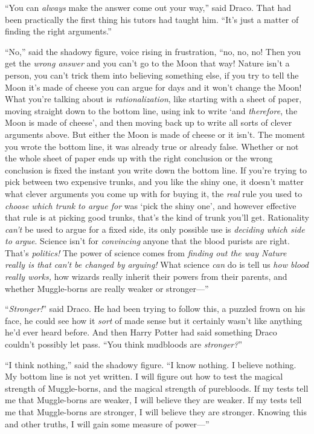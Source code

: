 “You can \emph{always} make the answer come out your way,” said Draco. That had been practically the first thing his tutors had taught him. “It’s just a matter of finding the right arguments.”

“No,” said the shadowy figure, voice rising in frustration, “no, no, no! Then you get the \emph{wrong answer} and you can’t go to the Moon that way! Nature isn’t a person, you can’t trick them into believing something else, if you try to tell the Moon it’s made of cheese you can argue for days and it won’t change the Moon! What you’re talking about is \emph{rationalization}, like starting with a sheet of paper, moving straight down to the bottom line, using ink to write ‘and \emph{therefore}, the Moon is made of cheese’, and then moving back up to write all sorts of clever arguments above. But either the Moon is made of cheese or it isn’t. The moment you wrote the bottom line, it was already true or already false. Whether or not the whole sheet of paper ends up with the right conclusion or the wrong conclusion is fixed the instant you write down the bottom line. If you’re trying to pick between two expensive trunks, and you like the shiny one, it doesn’t matter what clever arguments you come up with for buying it, the \emph{real} rule you used to \emph{choose which trunk to argue for} was ‘pick the shiny one’, and however effective that rule is at picking good trunks, that’s the kind of trunk you’ll get. Rationality \emph{can’t} be used to argue for a fixed side, its only possible use is \emph{deciding which side to argue}. Science isn’t for \emph{convincing} anyone that the blood purists are right. That’s \emph{politics!} The power of science comes from \emph{finding out the way Nature really is that can’t be changed by arguing!} What science \emph{can} do is tell us \emph{how blood really works,} how wizards really inherit their powers from their parents, and whether Muggle-borns are really weaker or stronger—”

“\emph{Stronger!}” said Draco. He had been trying to follow this, a puzzled frown on his face, he could see how it \emph{sort} of made sense but it certainly wasn’t like anything he’d ever heard before. And then Harry Potter had said something Draco couldn’t possibly let pass. “You think mudbloods are \emph{stronger?}”

“I think nothing,” said the shadowy figure. “I know nothing. I believe nothing. My bottom line is not yet written. I will figure out how to test the magical strength of Muggle-borns, and the magical strength of purebloods. If my tests tell me that Muggle-borns are weaker, I will believe they are weaker. If my tests tell me that Muggle-borns are stronger, I will believe they are stronger. Knowing this and other truths, I will gain some measure of power—”


